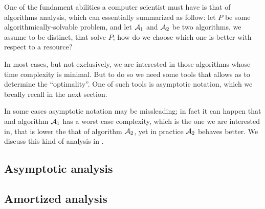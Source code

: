 \documentclass{subfiles}
\begin{document}
    One of the fundament abilities a computer scientist must have is that of algorithms analysis,
        which can essentially summarized as follow: let \(P\) be some algorithmically-solvable problem, 
        and let \(\mathcal{A}_{1}\) and \(\mathcal{A}_{2}\) be two algorithms, we assume to be distinct,
        that solve \(P\); how do we choose which one is better with respect to a resource?
        
    In most cases, but not exclusively, we are interested in those algorithms whose 
        time complexity is minimal. But to do so we need some tools that allows as 
        to determine the ``optimality''. One of such tools is asymptotic notation, 
        which we breafly recall in the next section.

    In some cases asymptotic notation may be missleading; in fact it can happen 
        that and algorithm \(\mathcal{A}_{1}\) has a worst case complexity, 
        which is the one we are interested in, that is lower the that of algorithm \(\mathcal{A}_{2}\),
        yet in practice \(\mathcal{A}_{2}\) behaves better. We discuss this kind of analysis in .

    \subsection{Asymptotic analysis}
    

    \subsection{Amortized analysis}
    
\end{document}
